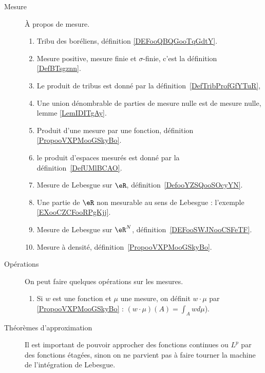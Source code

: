       \label{THEMEooKLVRooEqecQk}
\begin{description}
	\item[Mesure]
	      À propos de mesure.
	      \begin{enumerate}
		      \item
		            Tribu des boréliens, définition \ref{DEFooQBQGooTqGdtY}.
		      \item
		            Mesure positive, mesure finie et \( \sigma\)-finie, c'est la définition \ref{DefBTsgznn}.

		      \item Le produit de tribus est donné par la définition~\ref{DefTribProfGfYTuR},     %
		      \item
		            Une union dénombrable de parties de mesure nulle est de mesure nulle, lemme \ref{LemIDITgAy}.
		      \item
		            Produit d'une mesure par une fonction, définition \ref{PropooVXPMooGSkyBo}.
		      \item le produit d'espaces mesurés est donné par la définition~\ref{DefUMlBCAO}.     %
		      \item
		            Mesure de Lebesgue sur \( \eR\), définition~\ref{DefooYZSQooSOcyYN}.
		      \item
		            Une partie de \( \eR\) non mesurable au sens de Lebesgue : l'exemple \ref{EXooCZCFooRPgKjj}.
		      \item
		            Mesure de Lebesgue sur \( \eR^N\), définition~\ref{DEFooSWJNooCSFeTF}.
		      \item
		            Mesure à densité, définition~\ref{PropooVXPMooGSkyBo}.
	      \end{enumerate}
	\item[Opérations]
	      On peut faire quelques opérations sur les mesures.
	      \begin{enumerate}
		      \item
		            Si \( w\) est une fonction et \( \mu\) une mesure, on définit \( w\cdot \mu  \) par \ref{PropooVXPMooGSkyBo} : \( (w\cdot \mu)(A)=\int_Awd\mu\)).
	      \end{enumerate}
	\item[Théorèmes d'approximation]
	      Il est important de pouvoir approcher des fonctions continues ou \( L^p\) par des fonctions étagées, sinon on ne parvient pas à faire tourner la machine de l'intégration de Lebesgue.

\end{description}
